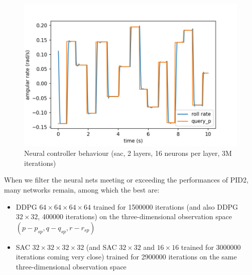 \documentclass[anonymous=true,format=sigconf, screen=true, review=false]{acmart}
\begin{document}
\begin{figure}
\includegraphics[width=\linewidth]{sac_16_16_cp_30}
\caption{Neural controller behaviour (sac, 2 layers, 16 neurons per layer, 3M iterations)}
\label{fig:samplespike}
\end{figure}



When we filter the neural nets meeting or exceeding the performances of PID2, many networks remain, among which  %
the best are:
\begin{itemize}
\item DDPG $64\times 64\times 64\times 64$ trained for 1500000  iterations (and also DDPG $32\times 32$, 400000 iterations) on the three-dimensional observation space $(p-p_{sp}, q-q_{sp},r-r_{sp})$
%
    \item SAC $32\times 32 \times 32 \times 32$ (and SAC $32 \times 32$ and $16\times 16$ trained for 3000000 iterations coming very close) trained for  2900000 iterations on the same three-dimensional observation space
\end{itemize}
\end{document}
